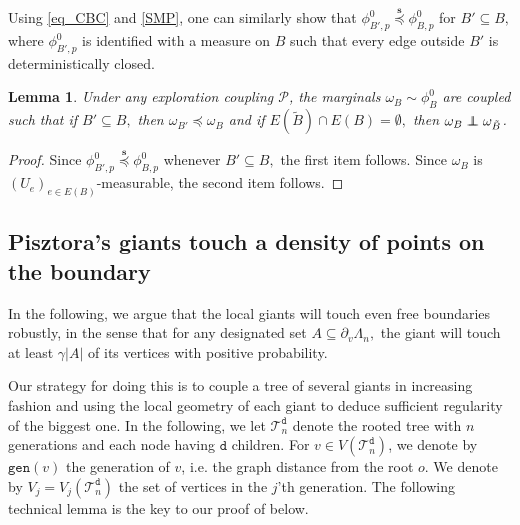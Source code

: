 \documentclass[article,11pt,reqno]{amsart}
\newcommand\independent{\protect\mathpalette{\protect\independenT}{\perp}}
\def\independenT#1#2{\mathrel{\rlap{$#1#2$}\mkern2mu{#1#2}}}
\newcommand{\ssd}  {\overset{\mathbf{s}}{\preceq}}
\newtheorem{lemma}[theorem]{Lemma}
\begin{document}
\begin{appendix}
Using \eqref{eq_CBC} and \eqref{SMP}, one can similarly show that $\phi_{B',p}^0 \ssd \phi_{B,p}^0$ for $B'\subseteq B,$ where $\phi_{B',p}^0$ is identified with a measure on $B$ such that every edge outside $B'$ is deterministically closed. %


\begin{lemma}\label{lemma:coupling_many_FK_measures}
    Under any exploration coupling $\mathscr{P}$, the marginals $\omega_B \sim \phi_B^0$ are coupled such that if $B' \subseteq B,$ then $\omega_{B'} \preceq \omega_{B}$ and if $ E(\tilde B) \cap E(B) = \emptyset,
    $ then $\omega_B \independent \omega_{\tilde B}$. 
\end{lemma}
\begin{proof}
 Since $\phi_{B',p}^0 \ssd \phi_{B,p}^0$ whenever $B' \subseteq B,$ the first item follows. Since $\omega_B$ is $(U_e)_{e\in E(B)}$-measurable, the second item follows.
\end{proof}





\subsection{Pisztora's giants touch a density of points on the boundary}
In the following, we argue that the local giants will touch even free boundaries robustly, in the sense that for any designated set $A\subseteq \partial_v \Lambda_n,$ the giant will touch at least $\gamma|A|$ of its vertices with positive probability.

Our strategy for doing this is to couple a tree of several giants in increasing fashion and using the local geometry of each giant to deduce sufficient regularity of the biggest one. In the following, we let $\mathscr{T}_n^{\mathtt{d}}$ denote the rooted tree with $n$ generations and each node having $\mathtt{d}$ children. For $v\in V(\mathscr{T}_n^\mathtt{d})$, we denote by $\mathtt{gen}(v)$ the generation of $v$, i.e. the graph distance from the root $o$. We denote by $V_j=V_j(\mathscr{T}_n^\mathtt{d})$ the set of vertices in the $j$'th generation. The following technical lemma is the key to our proof of  below.


\end{appendix}
\end{document}
